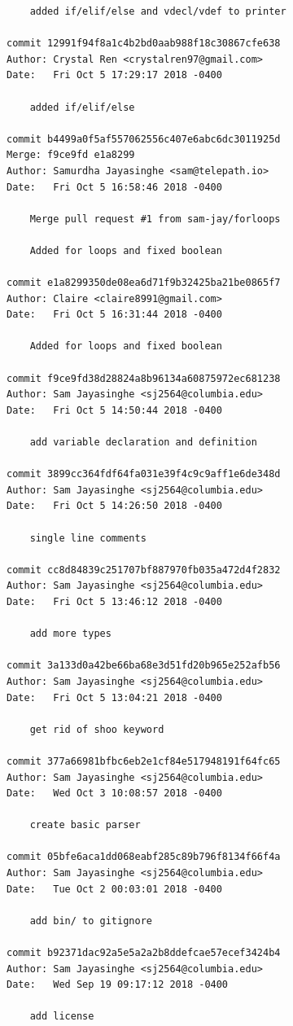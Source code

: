 \documentclass[12pt]{article}
\begin{document}
\begin{lstlisting}
    added if/elif/else and vdecl/vdef to printer

commit 12991f94f8a1c4b2bd0aab988f18c30867cfe638
Author: Crystal Ren <crystalren97@gmail.com>
Date:   Fri Oct 5 17:29:17 2018 -0400

    added if/elif/else

commit b4499a0f5af557062556c407e6abc6dc3011925d
Merge: f9ce9fd e1a8299
Author: Samurdha Jayasinghe <sam@telepath.io>
Date:   Fri Oct 5 16:58:46 2018 -0400

    Merge pull request #1 from sam-jay/forloops
    
    Added for loops and fixed boolean

commit e1a8299350de08ea6d71f9b32425ba21be0865f7
Author: Claire <claire8991@gmail.com>
Date:   Fri Oct 5 16:31:44 2018 -0400

    Added for loops and fixed boolean

commit f9ce9fd38d28824a8b96134a60875972ec681238
Author: Sam Jayasinghe <sj2564@columbia.edu>
Date:   Fri Oct 5 14:50:44 2018 -0400

    add variable declaration and definition

commit 3899cc364fdf64fa031e39f4c9c9aff1e6de348d
Author: Sam Jayasinghe <sj2564@columbia.edu>
Date:   Fri Oct 5 14:26:50 2018 -0400

    single line comments

commit cc8d84839c251707bf887970fb035a472d4f2832
Author: Sam Jayasinghe <sj2564@columbia.edu>
Date:   Fri Oct 5 13:46:12 2018 -0400

    add more types

commit 3a133d0a42be66ba68e3d51fd20b965e252afb56
Author: Sam Jayasinghe <sj2564@columbia.edu>
Date:   Fri Oct 5 13:04:21 2018 -0400

    get rid of shoo keyword

commit 377a66981bfbc6eb2e1cf84e517948191f64fc65
Author: Sam Jayasinghe <sj2564@columbia.edu>
Date:   Wed Oct 3 10:08:57 2018 -0400

    create basic parser

commit 05bfe6aca1dd068eabf285c89b796f8134f66f4a
Author: Sam Jayasinghe <sj2564@columbia.edu>
Date:   Tue Oct 2 00:03:01 2018 -0400

    add bin/ to gitignore

commit b92371dac92a5e5a2a2b8ddefcae57ecef3424b4
Author: Sam Jayasinghe <sj2564@columbia.edu>
Date:   Wed Sep 19 09:17:12 2018 -0400

    add license


\end{lstlisting}
\end{document}
